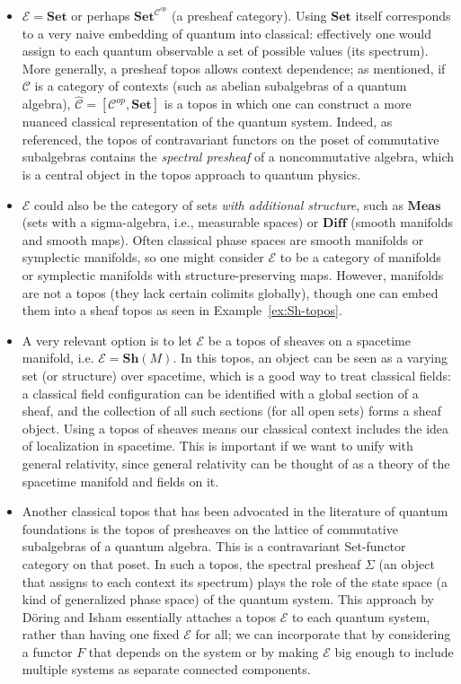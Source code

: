 \begin{itemize}
    \item $\mathcal{E} = \mathbf{Set}$ or perhaps $\mathbf{Set}^{\mathcal{C}^{op}}$ (a presheaf category). Using $\mathbf{Set}$ itself corresponds to a very naive embedding of quantum into classical: effectively one would assign to each quantum observable a set of possible values (its spectrum). More generally, a presheaf topos allows context dependence; as mentioned, if $\mathcal{C}$ is a category of contexts (such as abelian subalgebras of a quantum algebra), $\widehat{\mathcal{C}} = [\mathcal{C}^{op}, \mathbf{Set}]$ is a topos in which one can construct a more nuanced classical representation of the quantum system. Indeed, as referenced, the topos of contravariant functors on the poset of commutative subalgebras contains the \emph{spectral presheaf} of a noncommutative algebra, which is a central object in the topos approach to quantum physics.
    
    \item $\mathcal{E}$ could also be the category of sets \textit{with additional structure}, such as $\mathbf{Meas}$ (sets with a sigma-algebra, i.e., measurable spaces) or $\mathbf{Diff}$ (smooth manifolds and smooth maps). Often classical phase spaces are smooth manifolds or symplectic manifolds, so one might consider $\mathcal{E}$ to be a category of manifolds or symplectic manifolds with structure-preserving maps. However, manifolds are not a topos (they lack certain colimits globally), though one can embed them into a sheaf topos as seen in Example~\ref{ex:Sh-topos}.
    
    \item A very relevant option is to let $\mathcal{E}$ be a topos of sheaves on a spacetime manifold, i.e. $\mathcal{E} = \mathbf{Sh}(M)$. In this topos, an object can be seen as a varying set (or structure) over spacetime, which is a good way to treat classical fields: a classical field configuration can be identified with a global section of a sheaf, and the collection of all such sections (for all open sets) forms a sheaf object. Using a topos of sheaves means our classical context includes the idea of localization in spacetime. This is important if we want to unify with general relativity, since general relativity can be thought of as a theory of the spacetime manifold and fields on it.
    
    \item Another classical topos that has been advocated in the literature of quantum foundations is the topos of presheaves on the lattice of commutative subalgebras of a quantum algebra. This is a contravariant Set-functor category on that poset. In such a topos, the spectral presheaf $\Sigma$ (an object that assigns to each context its spectrum) plays the role of the state space (a kind of generalized phase space) of the quantum system. This approach by Döring and Isham essentially attaches a topos $\mathcal{E}$ to each quantum system, rather than having one fixed $\mathcal{E}$ for all; we can incorporate that by considering a functor $F$ that depends on the system or by making $\mathcal{E}$ big enough to include multiple systems as separate connected components.
\end{itemize}

